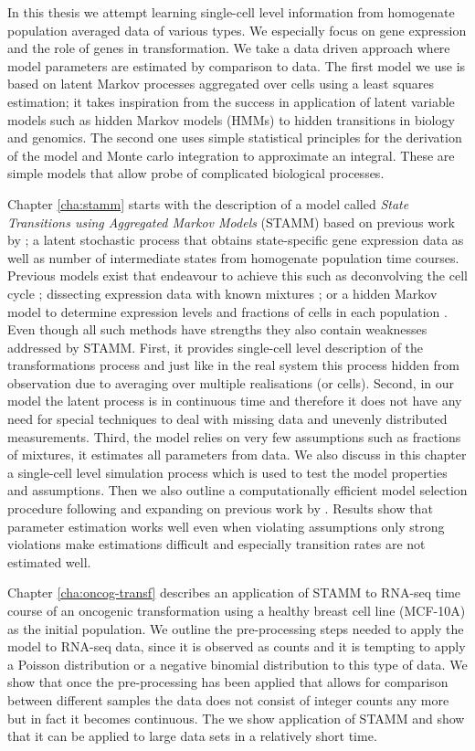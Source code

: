 In this thesis we attempt learning single-cell level information from homogenate population averaged data of various types. We especially focus on gene expression and the role of genes in transformation. We take a data driven approach where model parameters are estimated by comparison to data. The first model we use is based on latent Markov processes aggregated over cells using a least squares estimation; it takes inspiration from the success in application of latent variable models such as hidden Markov models (HMMs) to hidden transitions in biology and genomics. The second one uses simple statistical principles for the derivation of the model and Monte carlo integration to approximate an integral. These are simple models that allow probe of complicated biological processes.
 
Chapter \ref{cha:stamm} starts with the description of a model called \emph{State Transitions using Aggregated Markov Models} (STAMM) based on previous work by \cite{Armond:2013}; a latent stochastic process that obtains state-specific gene expression data as well as number of intermediate states from homogenate population time courses. Previous models exist that endeavour to achieve this such as deconvolving the cell cycle \citep{Bar-Joseph04082004}; dissecting expression data with known mixtures \citep{Lahdesmaki:2005fh}; or a hidden Markov model to determine expression levels and fractions of cells in each population \citep{Roy:2006ik}. Even though all such methods have strengths they also contain weaknesses addressed by STAMM. First, it provides single-cell level description of the transformations process and just like in the real system this process hidden from observation due to averaging over multiple realisations (or cells). Second, in our model the latent process is in continuous time and therefore it does not have any need for special techniques to deal with missing data and unevenly distributed measurements. Third, the model relies on very few assumptions such as fractions of mixtures, it estimates all parameters from data. We also discuss in this chapter a single-cell level simulation process which is used to test the model properties and assumptions. Then we also outline a computationally efficient model selection procedure following and expanding on previous work by \cite{Armond:2013}. Results show that parameter estimation works well even when violating assumptions only strong violations make estimations difficult and especially transition rates are not estimated well. 

Chapter \ref{cha:oncog-transf} describes an application of STAMM to RNA-seq time course of an oncogenic transformation using a healthy breast cell line (MCF-10A) as the initial population. We outline the pre-processing steps needed to apply the model to RNA-seq data, since it is observed as counts and it is tempting to apply a Poisson distribution or a negative binomial distribution to this type of data. We show that once the pre-processing has been applied that allows for comparison between different samples the data does not consist of integer counts any more but in fact it becomes continuous. The we show application of STAMM and show that it can be applied to large data sets in a relatively short time.

